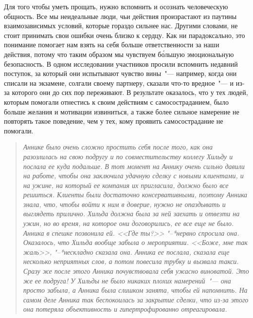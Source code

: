 Для того чтобы уметь прощать, нужно вспомнить и осознать человеческую общность. Все мы неидеальные люди, чьи действия произрастают из паутины взаимозависимых условий, которые гораздо сильнее нас. Другими словами, не стоит принимать свои ошибки очень близко к сердцу. Как ни парадоксально, это понимание помогает нам взять на себя больше ответственности за наши действия, потому что таким образом мы чувствуем б\'{о}льшую эмоциональную безопасность. В одном исследовании участников просили вспомнить недавний поступок, за который они испытывают чувство вины~"--- например, когда они списали на экзамене, солгали своему партнеру, сказали что-то вредное~"--- и из-за которого они до сих пор переживают. В результате оказалось, что у тех людей, которым помогали отнестись к своим действиям с самосостраданием, было больше желания и мотивации извиниться, а также более сильное намерение не повторять такое поведение, чем у тех, кому проявить самосострадание не помогали.  

\begin{quotation}
	\textit{
		Аннике было очень сложно простить себя после того, как она разозлилась на свою подругу и по совместительству коллегу Хильду и послала ее куда подальше. В тот момент на Аннику очень сильно давили на работе, чтобы она заключила удачную сделку с новыми клиентами, и на ужине, на который ее компания их пригласила, должно было все решиться. Клиенты были достаточно консервативными, поэтому Анника знала, что, чтобы войти к ним в доверие, нужно не опаздывать и выглядеть прилично. Хильда должна была за ней заехать и отвезти на ужин, но во время, на которое они договорились, ее все еще не было. Анника в спешке позвонила ей. <<Где ты?>> "--*нервно спросила она. Оказалось, что Хильда вообще забыла о мероприятии. <<Боже, мне так жаль>>, "--*нескладно сказала она. Анника ее послала, сказала еще несколько неприятных слов, а потом повесила трубку и вызвала такси. Сразу же после этого Анника почувствовала себя ужасно виноватой. Это же ее подруга! У Хильды не было никаких плохих намерений~"--- она просто забыла, а Анника была слишком занята, чтобы ей напомнить. На самом деле Анника так беспокоилась за закрытие сделки, что из-за этого она потеряла объективность и гипертрофированно отреагировала.
	}
\end{quotation}

\vspace{3ex}


